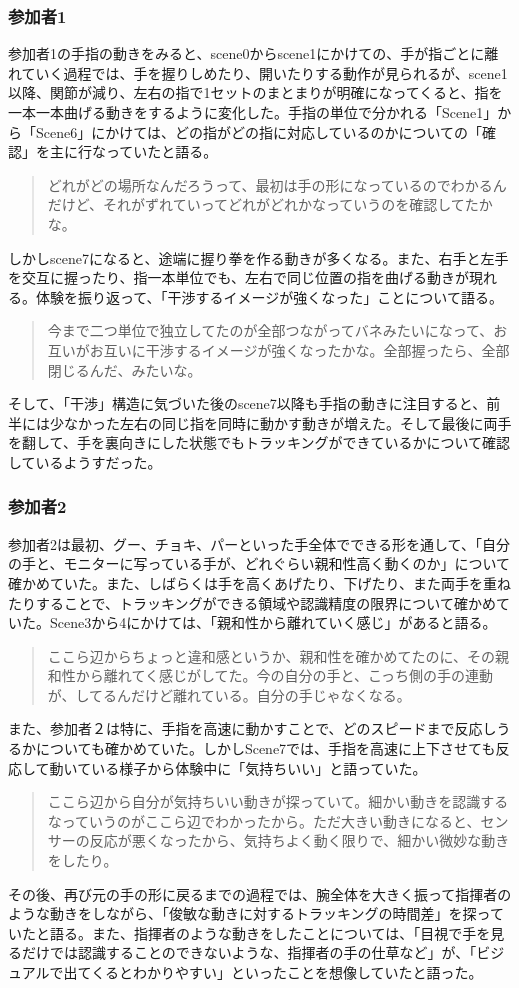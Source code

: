 \subsubsection*{参加者1}
参加者1の手指の動きをみると、scene0からscene1にかけての、手が指ごとに離れていく過程では、手を握りしめたり、開いたりする動作が見られるが、scene1以降、関節が減り、左右の指で1セットのまとまりが明確になってくると、指を一本一本曲げる動きをするように変化した。手指の単位で分かれる「Scene1」から「Scene6」にかけては、どの指がどの指に対応しているのかについての「確認」を主に行なっていたと語る。
\begin{quote}
  どれがどの場所なんだろうって、最初は手の形になっているのでわかるんだけど、それがずれていってどれがどれかなっていうのを確認してたかな。
\end{quote}
しかしscene7になると、途端に握り拳を作る動きが多くなる。また、右手と左手を交互に握ったり、指一本単位でも、左右で同じ位置の指を曲げる動きが現れる。体験を振り返って、「干渉するイメージが強くなった」ことについて語る。
\begin{quote}
  今まで二つ単位で独立してたのが全部つながってバネみたいになって、お互いがお互いに干渉するイメージが強くなったかな。全部握ったら、全部閉じるんだ、みたいな。
\end{quote}
そして、「干渉」構造に気づいた後のscene7以降も手指の動きに注目すると、前半には少なかった左右の同じ指を同時に動かす動きが増えた。そして最後に両手を翻して、手を裏向きにした状態でもトラッキングができているかについて確認しているようすだった。\\
\subsubsection*{参加者2}
参加者2は最初、グー、チョキ、パーといった手全体でできる形を通して、「自分の手と、モニターに写っている手が、どれぐらい親和性高く動くのか」について確かめていた。また、しばらくは手を高くあげたり、下げたり、また両手を重ねたりすることで、トラッキングができる領域や認識精度の限界について確かめていた。Scene3から4にかけては、「親和性から離れていく感じ」があると語る。
\begin{quote}
  ここら辺からちょっと違和感というか、親和性を確かめてたのに、その親和性から離れてく感じがしてた。今の自分の手と、こっち側の手の連動が、してるんだけど離れている。自分の手じゃなくなる。
\end{quote}
また、参加者２は特に、手指を高速に動かすことで、どのスピードまで反応しうるかについても確かめていた。しかしScene7では、手指を高速に上下させても反応して動いている様子から体験中に「気持ちいい」と語っていた。
\begin{quote}
  ここら辺から自分が気持ちいい動きが探っていて。細かい動きを認識するなっていうのがここら辺でわかったから。ただ大きい動きになると、センサーの反応が悪くなったから、気持ちよく動く限りで、細かい微妙な動きをしたり。
\end{quote}
その後、再び元の手の形に戻るまでの過程では、腕全体を大きく振って指揮者のような動きをしながら、「俊敏な動きに対するトラッキングの時間差」を探っていたと語る。また、指揮者のような動きをしたことについては、「目視で手を見るだけでは認識することのできないような、指揮者の手の仕草など」が、「ビジュアルで出てくるとわかりやすい」といったことを想像していたと語った。

